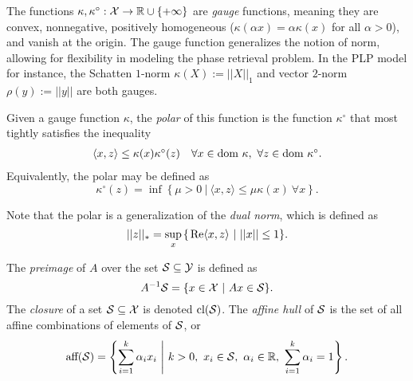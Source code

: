 The functions $\kappa, \kappa^\circ : {\mathcal X} \rightarrow {\mathbb R} \cup \{+\infty\}$ are \textit{gauge} functions, meaning they are convex, nonnegative, positively homogeneous ($\kappa(\alpha x) = \alpha \kappa(x)$ for all $\alpha > 0$), and vanish at the origin.  The gauge function generalizes the notion of norm, allowing for flexibility in modeling the phase retrieval problem.  In the PLP model for instance, the Schatten $1$-norm $\kappa(X) := || X ||_1$ and  vector $2$-norm $\rho(y) := ||y||$ are both gauges.

Given a gauge function $\kappa$, the \textit{polar} of this function is the function $\kappa^\circ$ that most tightly satisfies the inequality
\begin{equation}  			\label{Def:polar_function_1}
\begin{array}{ll}
	\langle x, z \rangle \leq \kappa(x) \kappa^\circ(z)
			&	\forall x \in \textnormal{dom} \ \kappa, \ \forall z \in \textnormal{dom} \ \kappa^\circ.
\end{array}
\end{equation}
Equivalently, the polar may be defined as \cite[Section 15]{rockafellar1970convex}
\begin{equation}  			\label{Def:polar_function_2}
\kappa^\circ(z) = \inf \left\{ \mu > 0 \ | \ \langle x, z \rangle \leq \mu \kappa(x) \ \forall x \right\}.
\end{equation}



Note that the polar is a generalization of the \textit{dual norm}, which is defined as
\begin{equation}			\label{Def:dual_norm}
||z||_* = \sup_{x} \hspace{0.05cm} \{ \hspace{0.05cm} \mathrm{Re} \langle x, z \rangle \ | \ ||x|| \leq 1 \}.
\end{equation}

The \textit{preimage} of $A$ over the set ${\mathcal S} \subseteq {\mathcal Y}$ is defined as 
\begin{equation} 			\label{Def:preimage}
A^{-1} {\mathcal S} = \{ x \in {\mathcal X} \ | \ Ax \in {\mathcal S} \}.
\end{equation}
The \textit{closure} of a set ${\mathcal S} \subseteq {\mathcal X}$ is denoted $\textnormal{cl}({\mathcal S})$. The \textit{affine hull} of ${\mathcal S}$ is the set of all affine combinations of elements of ${\mathcal S}$, or
\begin{equation}			\label{Def:affine_hull}
\text{aff}({\mathcal S}) = \left\{ \sum_{i=1}^k \alpha_i x_i \ \middle| \ k > 0, \ x_i \in {\mathcal S}, \ \alpha_i \in {\mathbb R}, \ \sum_{i=1}^k \alpha_i = 1 \right\}.
\end{equation}

